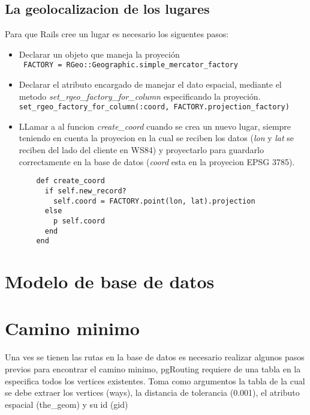     \subsection{La geolocalizacion de los lugares} %
    \label{subsec:la_geolocalizacion_de_los_lugares}
      Para que Rails cree un lugar es necesario los siguentes pasos:
        \begin{itemize}
          \item Declarar un objeto que maneja la proyeci\'on \\
          \verb+ FACTORY = RGeo::Geographic.simple_mercator_factory +
          \item Declarar el atributo encargado de manejar el dato espacial, mediante el metodo \emph{set\_rgeo\_factory\_for\_column} especificando la proyeci\'on. \verb|set_rgeo_factory_for_column(:coord, FACTORY.projection_factory)|
          \item LLamar a al funcion \emph{create\_coord} cuando se crea un nuevo lugar, siempre teniendo en cuenta la proyecion en la cual se reciben los datos (\emph{lon} y \emph{lat} se reciben del lado del cliente en WS84) y proyectarlo para guardarlo correctamente en la base de datos (\emph{coord} esta en la proyecion EPSG 3785).
          \begin{verbatim}
    def create_coord
      if self.new_record?
        self.coord = FACTORY.point(lon, lat).projection
      else
        p self.coord
      end
    end
          \end{verbatim}
        \end{itemize}



  \section{Modelo de base de datos} %
  \label{sec:modelo_de_base_de_datos}

  \section{Camino minimo} %
  \label{sec:camino_minimo}

    Una ves se tienen las rutas en la base de datos es necesario realizar algunos pasos previos para encontrar el camino minimo, pgRouting requiere de una tabla en la especifica todos los vertices existentes. Toma como argumentos la tabla de la cual se debe extraer los vertices (ways), la distancia de tolerancia (0.001), el atributo espacial (the\_geom) y su id (gid)

